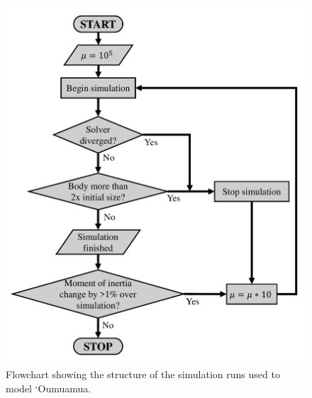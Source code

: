 \documentclass[twocolumn,doublespacing]{aastex631}
\begin{document}
\begin{figure}
\centering
\includegraphics[width=\linewidth,angle=0]{simflowchart.pdf}
\caption{Flowchart showing the structure of the simulation runs used to model `Oumuamua.}
\label{fig:simstruct}
\end{figure}
\end{document}
